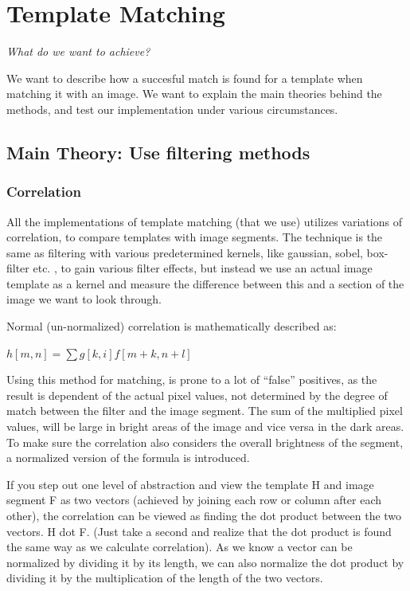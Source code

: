 \section{Template Matching}

\emph{What do we want to achieve?}

We want to describe how a succesful match is found for a template when
matching it with an image. We want to explain the main theories behind
the methods, and test our implementation under various circumstances.

\subsection{Main Theory: Use filtering methods}

\subsubsection{Correlation}

All the implementations of template matching (that we use) utilizes
variations of correlation, to compare templates with image segments. The
technique is the same as filtering with various predetermined kernels,
like gaussian, sobel, box-filter etc. , to gain various filter effects,
but instead we use an actual image template as a kernel and measure the
difference between this and a section of the image we want to look
through.

Normal (un-normalized) correlation is mathematically described as:

$h[m,n] = \sum{g[k,i] f[m+k,n+l]}$

Using this method for matching, is prone to a lot of ``false''
positives, as the result is dependent of the actual pixel values, not
determined by the degree of match between the filter and the image
segment. The sum of the multiplied pixel values, will be large in bright
areas of the image and vice versa in the dark areas. To make sure the
correlation also considers the overall brightness of the segment, a
normalized version of the formula is introduced.

If you step out one level of abstraction and view the template H and
image segment F as two vectors (achieved by joining each row or column
after each other), the correlation can be viewed as finding the dot
product between the two vectors. H dot F. (Just take a second and
realize that the dot product is found the same way as we calculate
correlation). As we know a vector can be normalized by dividing it by
its length, we can also normalize the dot product by dividing it by the
multiplication of the length of the two vectors.

